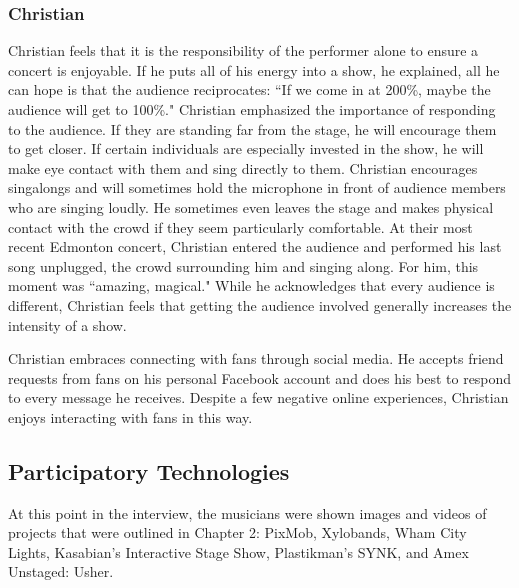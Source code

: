 \subsubsection{Christian}
Christian feels that it is the responsibility of the performer alone to ensure a concert is enjoyable. If he puts all of his energy into a show, he explained, all he can hope is that the audience reciprocates: ``If we come in at 200\%, maybe the audience will get to 100\%." Christian emphasized the importance of responding to the audience. If they are standing far from the stage, he will encourage them to get closer. If certain individuals are especially invested in the show, he will make eye contact with them and sing directly to them. Christian encourages singalongs and will sometimes hold the microphone in front of audience members who are singing loudly. He sometimes even leaves the stage and makes physical contact with the crowd if they seem particularly comfortable. At their most recent Edmonton concert, Christian entered the audience and performed his last song unplugged, the crowd surrounding him and singing along. For him, this moment was ``amazing, magical." While he acknowledges that every audience is different, Christian feels that getting the audience involved generally increases the intensity of a show.

Christian embraces connecting with fans through social media. He accepts friend requests from fans on his personal Facebook account and does his best to respond to every message he receives. Despite a few negative online experiences, Christian enjoys interacting with fans in this way.

\subsection{Participatory Technologies}

At this point in the interview, the musicians were shown images and videos of projects that were outlined in Chapter 2: PixMob, Xylobands, Wham City Lights, Kasabian's Interactive Stage Show, Plastikman's SYNK, and Amex Unstaged: Usher.

